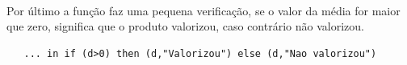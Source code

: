 \documentclass[a4paper]{article}
\begin{document}
\begin{enumerate}
\paragraph{}Por último a função faz uma pequena verificação, se o valor da média for maior que zero, significa que o produto valorizou, caso contrário não valorizou.
\begin{verbatim}
   ... in if (d>0) then (d,"Valorizou") else (d,"Nao valorizou")
\end{verbatim} 
\end{enumerate}
\end{document}
